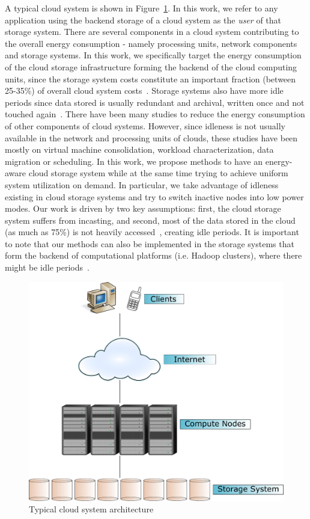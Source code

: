 A typical cloud system is shown in Figure~\ref{fig:cloud_architecture}. In this work, we refer to any 
application using the backend storage of a cloud system as the \textit{user} of that storage system.
There are several components in a cloud system contributing to the overall energy consumption - namely
 processing units, network
components and storage systems. In this work, we specifically target the energy consumption of the
cloud storage infrastructure forming the backend of the cloud computing units, since the storage
system costs constitute an important fraction (between 25-35\%) of overall cloud system
costs~\cite{Harnik:2009:LPM:1586640.1587438, Kim:2011:EPD:1951365.1951378, netapp_power}. Storage
systems also have more idle periods since data stored is usually redundant and archival, written once
and not touched again~\cite{Miller93}. There have been many studies to reduce the energy consumption of
other components of cloud systems. However, since idleness is not usually available in the network
and processing units of clouds, these studies have been mostly on virtual machine consolidation,
workload characterization, data migration or scheduling. In this work, we propose methods to have
an energy-aware cloud storage system while at the same time trying to achieve uniform system
utilization on demand. In particular, we take advantage of idleness existing in cloud storage systems
and try to switch inactive nodes into low power modes. Our work is driven by two key assumptions: first,
the cloud storage system suffers from incasting, and second, most of the data stored in the cloud (as much
as 75\%) is not heavily accessed~\cite{netapp_power}, creating idle periods. It is
important to note that our methods can also be implemented in the storage systems that form the backend
of computational platforms (i.e. Hadoop clusters), where there might be idle
periods~\cite{Kaushik:2010:GTE:1924920.1924927, Narayanan:2008:WOP:1416944.1416949}.


\begin{figure}[!htbp]
\centering
\includegraphics[width=\columnwidth,keepaspectratio]{FIG1.pdf}
\caption{Typical cloud system architecture}
\label{fig:cloud_architecture}
\end{figure}

